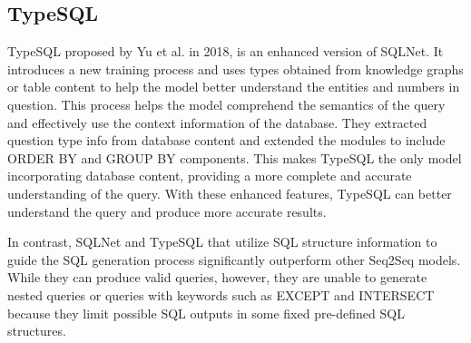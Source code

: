 \subsection{TypeSQL}
TypeSQL proposed by Yu et al. in 2018\cite{DBLP:journals/corr/abs-1804-09769}, is an enhanced version of SQLNet. It introduces a new training process and uses types obtained from knowledge graphs or table content to help the model better understand the entities and numbers in question. This process helps the model comprehend the semantics of the query and effectively use the context information of the database. They extracted question type info from database content and extended the modules to include ORDER BY and GROUP BY components. This makes TypeSQL the only model incorporating database content, providing a more complete and accurate understanding of the query. With these enhanced features, TypeSQL can better understand the query and produce more accurate results.

In contrast, SQLNet and TypeSQL that utilize SQL structure information to guide the SQL generation process significantly outperform other Seq2Seq models. While they can produce valid queries, however, they are unable to generate nested queries or queries with keywords such as EXCEPT and INTERSECT because they limit possible SQL outputs in some fixed pre-defined SQL structures.